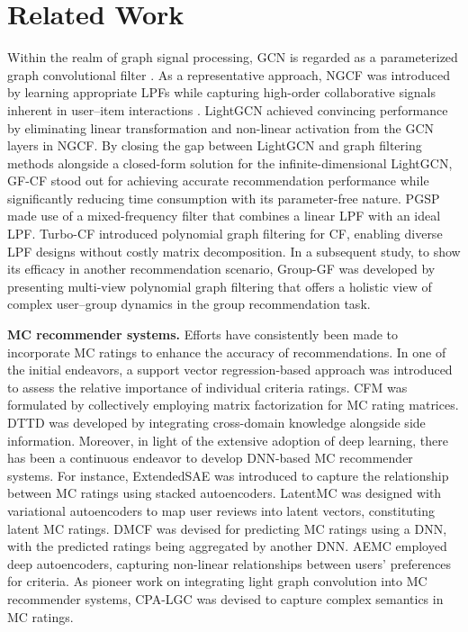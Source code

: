 \section{Related Work}
\label{section 5}
 Within the realm of graph signal processing, GCN is regarded as a parameterized graph convolutional filter \cite{DBLP:conf/iclr/KipfW17, shen2021powerful}. As a representative approach, NGCF \cite{wang2019neural} was introduced by learning appropriate LPFs while capturing high-order collaborative signals inherent in user--item interactions \cite{shen2021powerful}. LightGCN \cite{he2020lightgcn} achieved convincing performance by eliminating linear transformation and non-linear activation from the GCN layers in NGCF. By closing the gap between LightGCN and graph filtering methods alongside a closed-form solution for the infinite-dimensional LightGCN, GF-CF \cite{shen2021powerful} stood out for achieving accurate recommendation performance while significantly reducing time consumption with its parameter-free nature. PGSP \cite{liu2023personalized} made use of a mixed-frequency filter that combines a linear LPF with an ideal LPF. Turbo-CF \cite{park2024turbo} introduced polynomial graph filtering for CF, enabling diverse LPF designs without costly matrix decomposition. In a subsequent study, to show its efficacy in another recommendation scenario, Group-GF \cite{kim2025leveraging} was developed by presenting multi-view polynomial graph filtering that offers a holistic view of complex user--group dynamics in the group recommendation task. 

\noindent\textbf{MC recommender systems.} Efforts have consistently been made to incorporate MC ratings to enhance the accuracy of recommendations. In one of the initial endeavors, a support vector regression-based approach \cite{jannach2012accuracy} was introduced to assess the relative importance of individual criteria ratings. CFM \cite{fan2021predicting} was formulated by collectively employing matrix factorization for MC rating matrices. DTTD \cite{chen2021deep} was developed by integrating cross-domain knowledge alongside side information. Moreover, in light of the extensive adoption of deep learning, there has been a continuous endeavor to develop DNN-based MC recommender systems. For instance, ExtendedSAE \cite{tallapally2018user} was introduced to capture the relationship between MC ratings using stacked autoencoders. LatentMC \cite{li2019latent} was designed with variational autoencoders to map user reviews into latent vectors, constituting latent MC ratings. DMCF \cite{nassar2020novel} was devised for predicting MC ratings using a DNN, with the predicted ratings being aggregated by another DNN. AEMC \cite{shambour2021deep} employed deep autoencoders, capturing non-linear relationships between users' preferences for criteria. As pioneer work on integrating light graph convolution into MC recommender systems, CPA-LGC \cite{park2023criteria} was devised to capture complex semantics in MC ratings. 
\vspace{-3mm}